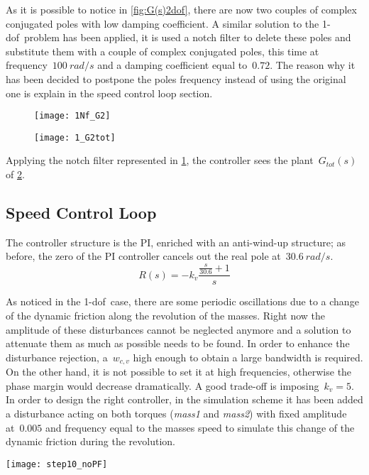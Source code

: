 As it is possible to notice in \cref{fig:G(s)2dof}, there are now two couples of complex conjugated poles with low damping coefficient. A similar solution to the \acrshort{1-dof}\ problem has been applied, it is used a notch filter to delete these poles and substitute them with a couple of complex conjugated poles, this time at frequency~$100\ rad/s$ and a damping coefficient equal to~$0.72$. The reason why it has been decided to postpone the poles frequency instead of using the original one is explain in the speed control loop section.


\begin{figure*}[h]
	\centering
	\begin{subfigure}{0.35\columnwidth}
		\texttt{[image: 1Nf\_G2]}
		\label{fig:Notch Filter2}
	\end{subfigure}
	\begin{subfigure}{0.35\columnwidth}
		\texttt{[image: 1\_G2tot]}
		\label{fig:Plant G(s) with Notch Filter2}
	\end{subfigure}
	\caption{Plant $G(s)$ with Notch Filter $N_f(s)$: $G_{tot}$(s)}
\end{figure*}


Applying the notch filter represented in \cref{fig:Notch Filter2}, the controller sees the plant~$G_{tot}(s)$ of \cref{fig:Plant G(s) with Notch Filter2}.

\newpage 
\subsection{Speed Control Loop}
The controller structure is the PI, enriched with an anti-wind-up structure; as before, the zero of the PI controller cancels out the real pole at~$30.6\ rad/s$.
\[
R(s)=-k_v
\frac{\frac{s}{30.6}+1}{s}
\]

As noticed in the \acrshort{1-dof}~case, there are some periodic oscillations due to a change of the dynamic friction along the revolution of the masses. Right now the amplitude of these disturbances cannot be neglected anymore and a solution to attenuate them as much as possible needs to be found. In order to enhance the disturbance rejection, a~$w_{c,v}$ high enough to obtain a large bandwidth is required. On the other hand, it is not possible to set it at high frequencies, otherwise the phase margin would decrease dramatically. A good trade-off is imposing~$k_v=5$.
 In order to design the right controller, in the simulation scheme it has been added a disturbance acting on both torques (\textit{mass1} and \textit{mass2}) with fixed amplitude at~$0.005$ and frequency equal to the masses speed to simulate this change of the dynamic friction during the revolution.
\begin{figure*}[h]
	\centering
	\texttt{[image: step10\_noPF]}
	\caption{Step response with $k_v=5 $}
	\label{fig:step10_noPF}
\end{figure*}

